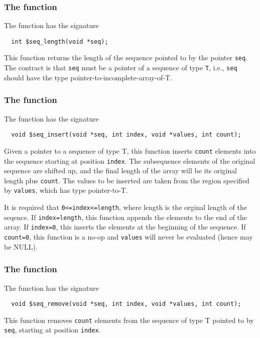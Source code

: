 \subsubsection{The \cseqlen{} function}
The \cseqlen{} function has the signature
\begin{verbatim}
  int $seq_length(void *seq);
\end{verbatim}
This function returns the length of the sequence pointed to by the pointer \texttt{seq}. The contract is that \texttt{seq} must be a pointer of a sequence of type \texttt{T}, i.e., \texttt{seq} should have the type pointer-to-incomplete-array-of-T.

\subsubsection{The \cseqinsert{} function}
The \cseqinsert{} function has the signature
\begin{verbatim}
  void $seq_insert(void *seq, int index, void *values, int count);
\end{verbatim}

Given a pointer to a sequence of type T, this function inserts \texttt{count} elements into the sequence starting at position
 \texttt{index}. The subsequence elements of the original sequence are shifted up, and the final length of the array will be its original length
plus \texttt{count}. The values to be inserted are taken from the region specified by \texttt{values}, which has type pointer-to-T.  

It is required that \texttt{0<=index<=length}, where length is the orginal length of the seqence. If \texttt{index=length}, this function appends the elements to the end of the array. If \texttt{index=0}, this inserts the elements at the beginning of the sequence.  If \texttt{count=0}, this function is a no-op and \texttt{values} will never be evaluated (hence may be NULL).

\subsubsection{The \cseqrm{} function}
The \cseqrm{} function has the signature
\begin{verbatim}
  void $seq_remove(void *seq, int index, void *values, int count);
\end{verbatim}

This function removes \texttt{count} elements from the sequence of type T pointed to by \texttt{seq}, starting at position
\texttt{index}. 

